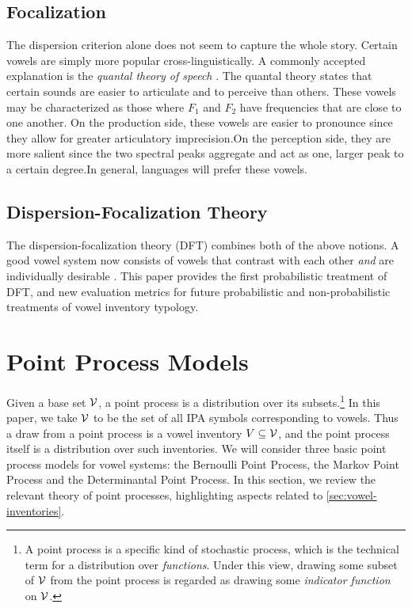 \documentclass[11pt,a4paper]{article}
\renewcommand{\cite}[2][]{\citep[#1]{#2}}
\begin{document}
\subsection{Focalization}\label{sec:focalization}

The dispersion criterion alone does not seem to capture the whole
story.  Certain vowels are simply more popular cross-linguistically.
A commonly accepted explanation is the {\em quantal theory of speech}
\cite{stevens1972quantal,stevens1989quanta}. The quantal theory states
that certain sounds are easier to articulate and to perceive than
others. These vowels may be characterized as those where $F_1$ and
$F_2$ have frequencies that are close to one another. On the
production side, these vowels are easier to pronounce since they allow
for greater articulatory imprecision.On the
perception side, they are more salient since the two spectral peaks
aggregate and act as one, larger peak to a certain degree.In general, languages will prefer these
vowels.

\subsection{Dispersion-Focalization Theory}\label{sec:dispersion-focalization}
The dispersion-focalization theory (DFT) combines both of the above notions. A good vowel system now consists of vowels that contrast with each other {\em and} are individually desirable \cite{schwartz1997dispersion}. This paper provides the first probabilistic treatment of DFT, and new evaluation metrics for future probabilistic and non-probabilistic treatments of vowel inventory typology.

\section{Point Process Models}\label{sec:point-processes}

Given a base set ${\cal V}$, a point process is a distribution over its subsets.\footnote{A point process is a specific kind of stochastic process, which is the technical term for a distribution over {\em functions}.  Under this view, 
  drawing some subset of ${\cal V}$ from the point process is regarded as drawing
  some {\em indicator function} on ${\cal V}$.
}
In this paper, we take ${\cal V}$ to be the set of all IPA
symbols corresponding to vowels.  Thus a draw from a point process is
a vowel inventory $V \subseteq {\cal V}$, and the point process itself
is a distribution over such inventories.  We
will consider three basic point process models for vowel systems: the 
Bernoulli Point Process, the Markov Point Process and the
Determinantal Point Process. In this section, we review the relevant
theory of point processes, highlighting aspects related to
\cref{sec:vowel-inventories}.
\end{document}
